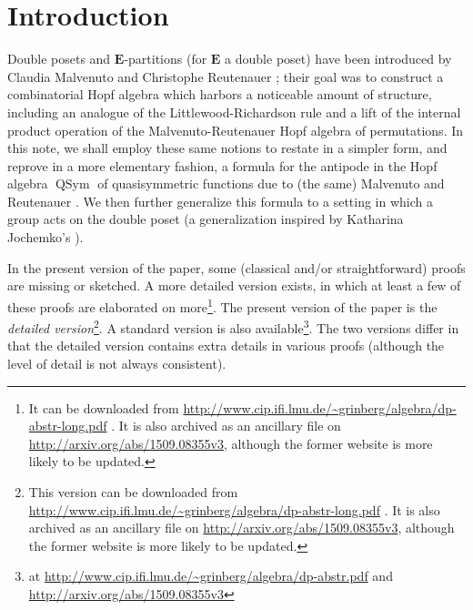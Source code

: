 \documentclass[numbers=enddot,12pt,final,onecolumn,notitlepage,abstracton]{scrartcl}
\theoremstyle{definition}
\newenvironment{verlong}{}{}
\newenvironment{vershort}{}{}
\newcommand{\QSym}{{\operatorname{QSym}}}
\newcommand{\EE}{{\mathbf{E}}}
\begin{document}
\begin{verlong}
\tableofcontents
\end{verlong}

\section{Introduction}
\label{sec:in}

Double posets and $\EE$-partitions (for $\EE$ a double poset)
have been introduced by Claudia Malvenuto and Christophe
Reutenauer \cite{Mal-Reu-DP}; their goal was to construct a
combinatorial Hopf algebra which harbors a noticeable amount of
structure, including an analogue of the Littlewood-Richardson
rule and a lift of the internal product operation of the
Malvenuto-Reutenauer Hopf algebra of permutations. In this note,
we shall employ these same notions to restate in a simpler form,
and reprove in a more elementary fashion, a formula for the
antipode in the Hopf algebra $\QSym$ of quasisymmetric functions
due to (the same) Malvenuto and Reutenauer
\cite[Theorem 3.1]{Mal-Reu}. We then further generalize this
formula to a setting in which a group acts on the double poset
(a generalization inspired by Katharina Jochemko's
\cite{Joch}).

\begin{vershort}
In the present version of the paper, some (classical and/or
straightforward) proofs are missing or sketched. A more detailed
version exists, in which at least a few of these proofs are
elaborated on more\footnote{It can be downloaded from \newline
\url{http://www.cip.ifi.lmu.de/~grinberg/algebra/dp-abstr-long.pdf} .
It is also archived as an ancillary file on
\url{http://arxiv.org/abs/1509.08355v3}, although the former
website is more likely to be updated.}.
\end{vershort}
\begin{verlong}
The present version of the paper is the
\textit{detailed version}\footnote{This version can be downloaded
from \newline
\url{http://www.cip.ifi.lmu.de/~grinberg/algebra/dp-abstr-long.pdf} .
It is also archived as an ancillary file on
\url{http://arxiv.org/abs/1509.08355v3}, although the former
website is more likely to be updated.}.
A standard version is also available\footnote{at
\url{http://www.cip.ifi.lmu.de/~grinberg/algebra/dp-abstr.pdf}
and
\url{http://arxiv.org/abs/1509.08355v3}}.
The two versions differ in that the detailed version contains extra
details in various proofs (although the level of detail is not
always consistent).
\end{verlong}
\end{document}
